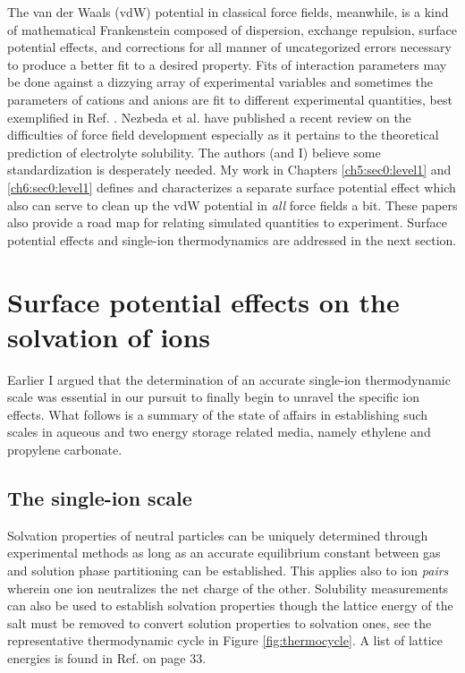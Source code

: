 \begin{intro}
   The van der Waals (vdW) potential in classical force fields, meanwhile, is a kind of mathematical Frankenstein composed of dispersion, exchange repulsion, surface potential
   effects, and corrections for all manner of uncategorized errors necessary to produce a better fit to a desired property. Fits of interaction parameters may be done against a
   dizzying array of experimental variables\cite{nezbeda2016recent} and sometimes the parameters of cations and anions are fit to different experimental quantities, best 
   exemplified in Ref. \cite{netz2009}. Nezbeda et al. have published a recent review on the difficulties of force field development especially as it pertains to the theoretical
   prediction of electrolyte solubility\cite{nezbeda2016recent}. The authors (and I) believe some standardization is desperately needed. My work in Chapters \ref{ch5:sec0:level1} 
   and \ref{ch6:sec0:level1} defines and characterizes a separate surface potential effect which also can serve to clean up the vdW potential in \emph{all} force fields a bit. 
   These papers also provide a road map for relating simulated quantities to experiment. Surface potential effects and single-ion thermodynamics are addressed in the next section.

  \section{\label{ch1:sec4:level1}Surface potential effects on the solvation of ions}
   Earlier I argued that the determination of an accurate single-ion thermodynamic scale was essential in our pursuit to finally begin to unravel the specific ion effects. What
   follows is a summary of the state of affairs in establishing such scales in aqueous and two energy storage related media, namely ethylene and propylene carbonate.

  \subsection{\label{ch1:sec4:level2}The single-ion scale}
   Solvation properties of neutral particles can be uniquely determined through experimental methods as long as an accurate equilibrium constant between gas and solution phase
   partitioning can be established. This applies also to ion \emph{pairs} wherein one ion neutralizes the net charge of the other. Solubility measurements can also be used to 
   establish solvation properties though the lattice energy of the salt must be removed to convert solution properties to solvation ones\cite{peruzzi2015solvation}, 
   see the representative thermodynamic cycle in Figure \ref{fig:thermocycle}. A list of lattice energies is found in Ref. \cite{marcus2012ions} on page 33. 


\end{intro}
